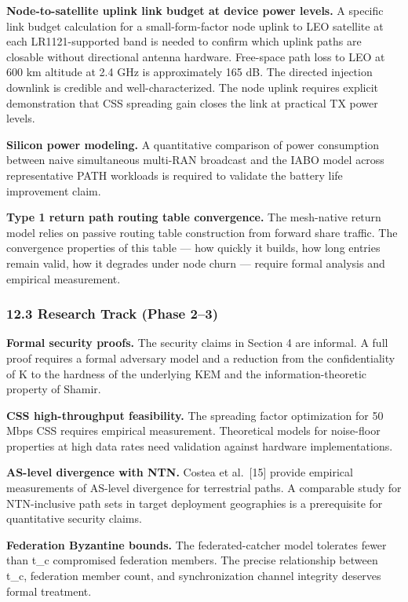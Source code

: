 \documentclass[
  11pt,
]{article}
\begin{document}
\textbf{Node-to-satellite uplink link budget at device power levels.} A
specific link budget calculation for a small-form-factor node uplink to
LEO satellite at each LR1121-supported band is needed to confirm which
uplink paths are closable without directional antenna hardware.
Free-space path loss to LEO at 600 km altitude at 2.4 GHz is
approximately 165 dB. The directed injection downlink is credible and
well-characterized. The node uplink requires explicit demonstration that
CSS spreading gain closes the link at practical TX power levels.

\textbf{Silicon power modeling.} A quantitative comparison of power
consumption between naive simultaneous multi-RAN broadcast and the IABO
model across representative PATH workloads is required to validate the
battery life improvement claim.

\textbf{Type 1 return path routing table convergence.} The mesh-native
return model relies on passive routing table construction from forward
share traffic. The convergence properties of this table --- how quickly
it builds, how long entries remain valid, how it degrades under node
churn --- require formal analysis and empirical measurement.

\hypertarget{research-track-phase-23}{%
\subsubsection{12.3 Research Track (Phase
2--3)}\label{research-track-phase-23}}

\textbf{Formal security proofs.} The security claims in Section 4 are
informal. A full proof requires a formal adversary model and a reduction
from the confidentiality of K to the hardness of the underlying KEM and
the information-theoretic property of Shamir.

\textbf{CSS high-throughput feasibility.} The spreading factor
optimization for 50 Mbps CSS requires empirical measurement. Theoretical
models for noise-floor properties at high data rates need validation
against hardware implementations.

\textbf{AS-level divergence with NTN.} Costea et al.~{[}15{]} provide
empirical measurements of AS-level divergence for terrestrial paths. A
comparable study for NTN-inclusive path sets in target deployment
geographies is a prerequisite for quantitative security claims.

\textbf{Federation Byzantine bounds.} The federated-catcher model
tolerates fewer than t\_c compromised federation members. The precise
relationship between t\_c, federation member count, and synchronization
channel integrity deserves formal treatment.
\end{document}
